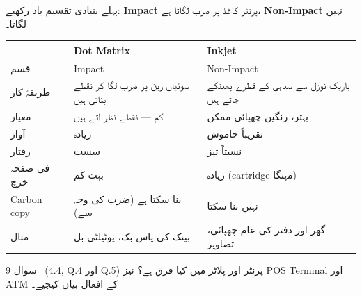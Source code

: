 \begin{hal}
پہلے بنیادی تقسیم یاد رکھیے: \textbf{\textenglish{Impact}} پرنٹر کاغذ پر ضرب
لگاتا ہے، \textbf{\textenglish{Non-Impact}} نہیں لگاتا۔

\medskip
\begin{center}
\begin{tabular}{@{}p{2.6cm} p{5.8cm} p{5.8cm}@{}}
\toprule
 & \textbf{\textenglish{Dot Matrix}} & \textbf{\textenglish{Inkjet}} \\
\midrule
قسم & \textenglish{Impact} & \textenglish{Non-Impact} \\
طریقۂ کار & سوئیاں ربن پر ضرب لگا کر نقطے بناتی ہیں & باریک نوزل سے سیاہی کے قطرے پھینکے جاتے ہیں \\
معیار & کم --- نقطے نظر آتے ہیں & بہتر، رنگین چھپائی ممکن \\
آواز & زیادہ & تقریباً خاموش \\
رفتار & سست & نسبتاً تیز \\
فی صفحہ خرچ & بہت کم & زیادہ (\textenglish{cartridge} مہنگا) \\
\textenglish{Carbon copy} & بنا سکتا ہے (ضرب کی وجہ سے) & نہیں بنا سکتا \\
مثال & بینک کی پاس بک، یوٹیلٹی بل & گھر اور دفتر کی عام چھپائی، تصاویر \\
\bottomrule
\end{tabular}
\end{center}

\end{hal}

\begin{sawal}{سوال \textenglish{9} \ \textnormal{\small(\textenglish{4.4, Q.4} اور \textenglish{Q.5})}}
پرنٹر اور پلاٹر میں کیا فرق ہے؟ نیز \textenglish{POS Terminal} اور
\textenglish{ATM} کے افعال بیان کیجیے۔
\end{sawal}

